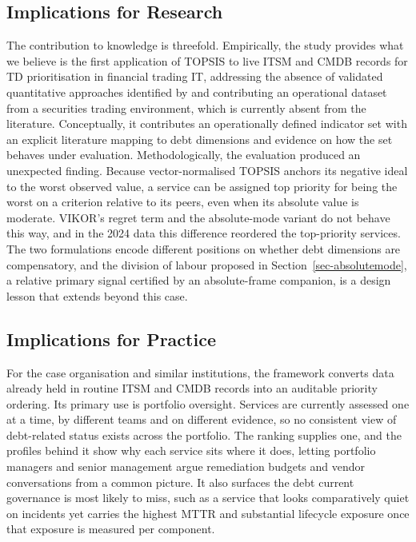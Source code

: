 \documentclass[
  authoryear,
  preprint]{elsarticle}
\begin{document}
\subsection{Implications for Research}\label{implications-for-research}

The contribution to knowledge is threefold. Empirically, the study
provides what we believe is the first application of TOPSIS to live ITSM
and CMDB records for TD prioritisation in financial trading IT,
addressing the absence of validated quantitative approaches identified
by \citet{lenarduzziSystematicLiteratureReview2021} and contributing an
operational dataset from a securities trading environment, which is
currently absent from the literature. Conceptually, it contributes an
operationally defined indicator set with an explicit literature mapping
to debt dimensions and evidence on how the set behaves under evaluation.
Methodologically, the evaluation produced an unexpected finding. Because
vector-normalised TOPSIS anchors its negative ideal to the worst
observed value, a service can be assigned top priority for being the
worst on a criterion relative to its peers, even when its absolute value
is moderate. VIKOR's regret term and the absolute-mode variant do not
behave this way, and in the 2024 data this difference reordered the
top-priority services. The two formulations encode different positions
on whether debt dimensions are compensatory, and the division of labour
proposed in Section~\ref{sec-absolutemode}, a relative primary signal
certified by an absolute-frame companion, is a design lesson that
extends beyond this case.

\subsection{Implications for Practice}\label{implications-for-practice}

For the case organisation and similar institutions, the framework
converts data already held in routine ITSM and CMDB records into an
auditable priority ordering. Its primary use is portfolio oversight.
Services are currently assessed one at a time, by different teams and on
different evidence, so no consistent view of debt-related status exists
across the portfolio. The ranking supplies one, and the profiles behind
it show why each service sits where it does, letting portfolio managers
and senior management argue remediation budgets and vendor conversations
from a common picture. It also surfaces the debt current governance is
most likely to miss, such as a service that looks comparatively quiet on
incidents yet carries the highest MTTR and substantial lifecycle
exposure once that exposure is measured per component.
\end{document}
